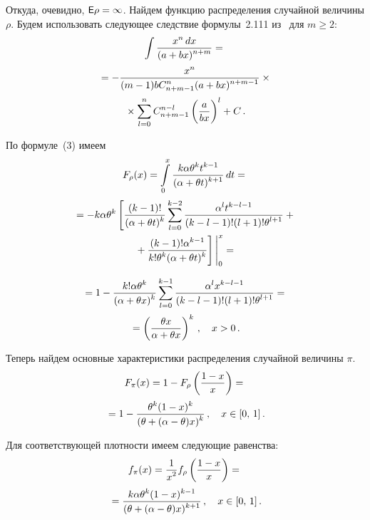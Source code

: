 \begin{multicols}{2}
Откуда, очевидно, ${\sf E}\rho=\infty$. Найдем функцию распределения случайной величины $\rho$. Будем использовать следующее
следствие формулы~2.111 из~\cite{5k} для $m\ge2$:
\begin{multline}
\int\displaystyle\frac{\displaystyle x^n\, dx\mathstrut}{\displaystyle {(a+bx)^{n+m}}\mathstrut}={}\\[2pt]
{}= -\displaystyle\frac{\displaystyle x^n\mathstrut}{\displaystyle {(m-1)b C_{n+m-1}^n(a+bx)^{n+m-1}}\mathstrut}\times{}\\[2pt]
{}\times
\sum_{l=0}^nC_{n+m-1}^{n-l}\left(\displaystyle\frac{\displaystyle a\mathstrut}{\displaystyle {bx}\mathstrut} \right)^l+C\,.
\end{multline}

По формуле~(3) имеем
\begin{multline*}
F_\rho(x)=\il{0}{x}\fr{k\alpha\theta^kt^{k-1}}{{(\alpha+\theta t)^{k+1}}}\, dt={}\\[2pt]
{}=-k\alpha\theta^k\left[\fr{(k-1)!}{{(\alpha+\theta
t)^k}}\sum_{l=0}^{k-2}\fr{\alpha^lt^{k-l-1}}{{(k-l-1)!(l+1)!\theta^{l+1}}}+{}\right.\\
\left.{}+\fr{(k-1)!\alpha^{k-1}}{{k!\theta^k(\alpha+
\theta t)^k}}
\vphantom{\sum_{l=0}^{k-2}} \right]
\Bigg|_0^x={}
\end{multline*}

\noindent
\begin{multline*}
{}=1-\displaystyle\frac{\displaystyle k!\alpha\theta^k\mathstrut}{\displaystyle {(\alpha+\theta x)^k}\mathstrut}\sum_{l=0}^{k-1}\displaystyle\frac{\displaystyle \alpha^lx^{k-l-1}\mathstrut}{\displaystyle {(k-l-1)!(l+1)!\theta^{l+1}}\mathstrut}={}\\[2pt]
{}=
\left(\displaystyle\frac{\displaystyle \theta x\mathstrut}{\displaystyle {\alpha+\theta x}\mathstrut}\right)^k\,,\quad x>0\,.
\end{multline*}

Теперь найдем основные характеристики распределения случайной величины $\pi$.
\begin{multline*}
F_\pi(x)=1-F_\rho\left(\displaystyle\frac{\displaystyle 1-x\mathstrut}{\displaystyle x\mathstrut}\right)={}\\[2pt]
{}=1-\displaystyle\frac{\displaystyle \theta^k(1-x)^k\mathstrut}{\displaystyle {(\theta+(\alpha-\theta)x)^k}\mathstrut}\,,\quad
x\in[0,\,1]\,.
\end{multline*}

Для соответствующей плотности имеем сле\-ду\-ющие равенства:
\begin{multline*}
f_\pi(x)=\displaystyle\frac{\displaystyle 1\mathstrut}{\displaystyle {x^2}\mathstrut}f_\rho\left(\displaystyle\frac{\displaystyle 1-x\mathstrut}{\displaystyle 
x\mathstrut}\right)={}\\[2pt]
{}=\displaystyle\frac{\displaystyle k\alpha\theta^k(1-x)^{k-1}\mathstrut}{\displaystyle {(\theta+(\alpha-\theta)x)^{k+1}}\mathstrut}\,,\quad x\in[0,\,1]\,.
\end{multline*}


\end{multicols}
